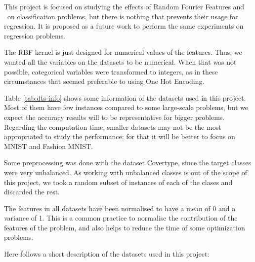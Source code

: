 \begin{pre-delivery}
  This project is focused on studying the effects of Random Fourier Features
  and \Nys\ on classification problems, but there is nothing that prevents their
  usage for regression. It is proposed as a future work to perform the
  same experiments on regression problems.

  The RBF kernel is just designed for numerical values of the features. Thus, we
  wanted all the variables on the datasets to be numerical. When that was not
  possible, categorical variables were transformed to integers, as in these
  circumstances that seemed preferable to using One Hot Encoding.

  Table \ref{tab:dts-info} shows some information of the datasets used in this
  project. Most of them have few instances compared to some large-scale
  problems, but we expect the accuracy results will to be representative for
  bigger problems. Regarding the computation time, smaller datasets may not be
  the most appropriated to study the performance; for that it will be better to
  focus on MNIST and Fashion MNIST.

  Some preprocessing was done with the dataset Covertype, since the target classes
  were very unbalanced. As working with unbalanced classes is out of the scope
  of this project, we took a random subset of instances of each of the clases
  and discarded the rest.

  The features in all datasets have been normalised to have a mean of 0 and
  a variance of 1. This is a common practice to  normalise the contribution
  of the features of the problem, and also helps to reduce the time of
  some optimization problems.

  Here follows a short description of the datasets used in this project:


\end{pre-delivery}
